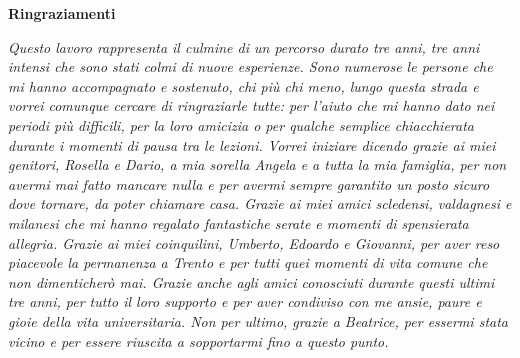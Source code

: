 \thispagestyle{empty}

\begin{center}
  {\bf \Huge Ringraziamenti}
\end{center}

\vspace{4cm}


\emph{
  Questo lavoro rappresenta il culmine di un percorso durato tre anni, tre anni intensi 
  che sono stati colmi di nuove esperienze. Sono numerose le persone
  che mi hanno accompagnato e sostenuto, chi più chi meno, lungo questa strada e vorrei comunque cercare
  di ringraziarle tutte: per l'aiuto che mi hanno dato nei periodi più difficili,
  per la loro amicizia o per qualche semplice chiacchierata durante i momenti di pausa tra le lezioni.    
  Vorrei iniziare dicendo grazie ai miei genitori, Rosella e Dario, a mia sorella Angela e a tutta la mia famiglia, 
  per non avermi mai fatto mancare nulla e per avermi sempre garantito un posto sicuro dove tornare, da poter chiamare casa.
  Grazie ai miei amici scledensi, valdagnesi e milanesi che mi hanno regalato fantastiche
  serate e momenti di spensierata allegria. Grazie ai miei coinquilini, Umberto, Edoardo e Giovanni, per aver 
  reso piacevole la permanenza a Trento e per tutti quei momenti di vita comune che non dimenticherò mai. 
  Grazie anche agli amici conosciuti durante questi ultimi tre anni, per tutto il loro supporto e per aver condiviso 
  con me ansie, paure e gioie della vita universitaria. Non per ultimo, grazie a Beatrice, per essermi stata vicino e
  per essere riuscita a sopportarmi fino a questo punto. 
}
